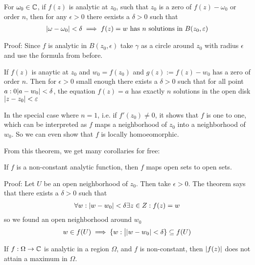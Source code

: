 \begin{theorem}[]
	For $\omega_0 \in \mathbb{C}$, if $f(z)$ is analytic at $z_0$, such that $z_0$ is a zero of $f(z) - \omega_0$ or order $n$, then for any $\epsilon > 0$ there eexists a $\delta >0$ such that
	\begin{align*}
		\vert\omega - \omega_0\vert < \delta \implies f(z) = w \text{ has $n$ solutions in } B(z_0,\varepsilon)
	\end{align*}
\end{theorem}
Proof: Since $f$ is analytic in $B(z_0,\epsilon)$ take $\gamma$ as a circle around $z_0$ with radius $\epsilon$ and use the formula from before.



\begin{theorem}[]
	If $f(z)$ is anaytic at $z_0$ and $w_0 = f(z_0)$ and $g(z) := f(z) - w_0$ has a zero of order $n$. 
	Then for $\epsilon > 0$ small enough there exists a $\delta > 0$ such that for all point $a: 0 \vert a-w_0\vert < \delta$, the equation $f(z) = a$ has exactly $n$ solutions in the open disk $\vert z - z_0\vert < \varepsilon$
\end{theorem}
In the special case where $n = 1$, i.e. if $f'(z_0) \neq 0$, 
it shows that $f$ is one to one, which can be interpreted as $f$ maps a neighborhood of $z_0$ into a neighborhood of $w_0$.
So we can even show that $f$ is locally homoeomorphic.

From this theorem, we get many corollaries for free:

\begin{corollary}[]
If $f$ is a non-constant analytic function, then $f$ maps open sets to open sets.
\end{corollary}
Proof: Let $U$ be an open neighborhood of $z_0$. Then take $\epsilon > 0$. The theorem says that there exists a $\delta > 0$ such that \begin{align*}
\forall w: \vert w - w_0\vert < \delta \exists z \in Z:f(z) = w
\end{align*}
so we found an open neighborhood around $w_0$
\begin{align*}
	w \in f(U) \implies \{w: \big\vert \vert w - w_0\vert < \delta\} \subseteq f(U)
\end{align*}


\begin{corollary}
	If $f: \Omega \to \mathbb{C}$ is analytic in a region $\Omega$, and $f$ is non-constant, then $\vert f(z)\vert$ does not attain a maximum in $\Omega$.
\end{corollary}

